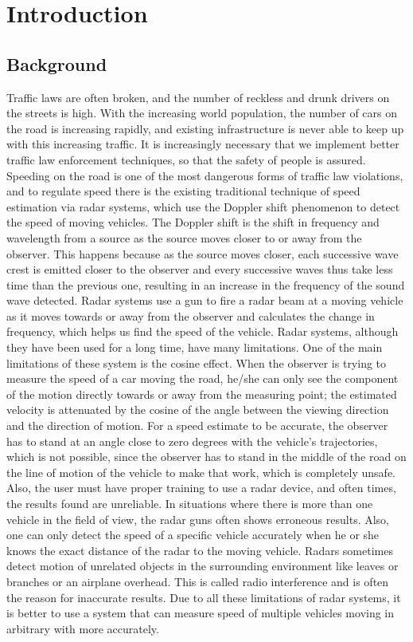 \documentclass[a4paper]{aitthesis}
\begin{document}
\pagestyle{plain}


%
\chapter{Introduction} \label{introduction}

 \section{Background}
Traffic laws are often broken, and the number of reckless and drunk drivers on the streets is high. With the increasing world population, the number of cars on the road is increasing rapidly, and existing infrastructure is never able to keep up with this increasing traffic. It is increasingly necessary that we implement better traffic law enforcement techniques, so that the safety of people is assured. Speeding on the road is one of the most dangerous forms of traffic law violations, and to regulate speed there is the existing traditional technique of speed estimation via radar systems, which use the Doppler shift phenomenon to detect the speed of moving vehicles. The Doppler shift is the shift in frequency and wavelength  from a source as the source moves closer to or away from the observer. This happens because as the source moves closer, each successive wave crest is emitted closer to the observer and every successive waves thus take less time than the previous one, resulting in an increase in the frequency of the sound wave detected. Radar systems use a gun to fire a radar beam at a moving vehicle as it moves towards or away from the observer and calculates the change in frequency, which helps us find the speed of the vehicle. Radar systems, although they have been used for a long time, have many limitations. One of the main limitations of these system is the cosine effect. When the observer is trying to measure the speed of a car moving the road, he/she can only see the component of the motion directly towards or away from the measuring point; the estimated velocity is attenuated by the cosine of the angle between the viewing direction and the direction of motion. For a speed estimate to be accurate, the observer has to stand at an angle close to zero degrees with the vehicle's trajectories, which is not possible, since the observer has to stand in the middle of the road on the line of motion of the vehicle to make that work, which is completely unsafe. Also, the user must have proper training to use a radar device, and often times, the results found are unreliable. In situations where there is more than one vehicle in the field of view, the radar guns often shows erroneous results. Also, one can only detect the speed of a specific vehicle accurately when he or she knows the exact distance of the radar to the moving vehicle. Radars sometimes detect motion of unrelated objects in the surrounding environment like leaves or branches or an airplane overhead. This is called radio interference and is often the reason for inaccurate results. Due to all these limitations of radar systems, it is better to use a system that can measure speed of multiple vehicles moving in arbitrary with more accurately.
\end{document}
